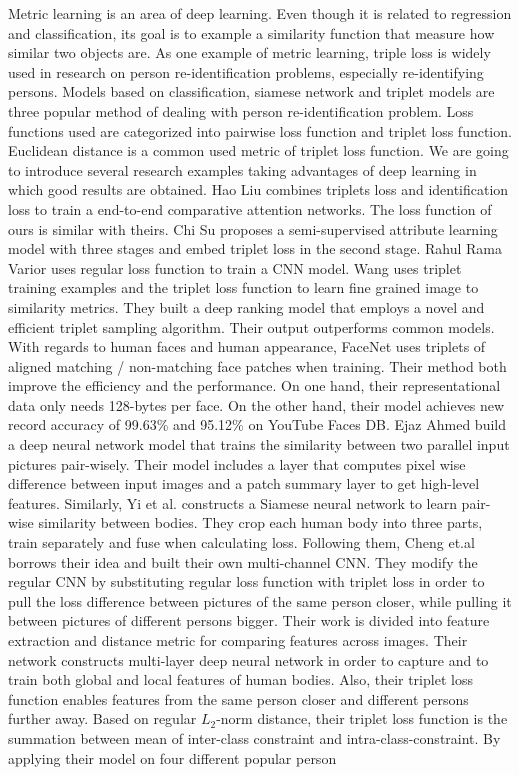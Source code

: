\documentclass[11pt,onecolumn,letterpaper]{article}
\begin{document}
Metric learning is an area of deep learning. Even though it is related to regression and classification, its goal is to example a similarity function that measure how similar two objects are. As one example of metric learning, triple loss is widely used in research on person re-identification problems, especially re-identifying persons. Models based on classification, siamese network and triplet models are three popular method of dealing with person re-identification problem. Loss functions used are categorized into pairwise loss function and triplet loss function. Euclidean distance is a common used metric of triplet loss function. 
\newline
We are going to introduce several research examples taking advantages of deep learning in which good results are obtained. Hao Liu \cite{liu2016end} combines triplets loss and identification loss to train a end-to-end comparative attention networks. The loss function of ours is similar with theirs. Chi Su \cite{su2016deep} proposes a semi-supervised attribute learning model with three stages and embed triplet loss in the second stage. Rahul Rama Varior \cite{varior2016learning} uses regular loss function to train a CNN model. Wang \cite{wang2014learning} uses triplet training examples and the triplet loss function to learn fine grained image to similarity metrics. They built a deep ranking model that employs a novel and efficient triplet sampling algorithm. Their output outperforms common models. With regards to human faces and human appearance, FaceNet \cite{schroff2015facenet} uses triplets of aligned matching / non-matching face patches when training. Their method both improve the efficiency and the performance. On one hand, their representational data only needs 128-bytes per face. On the other hand, their model achieves new record accuracy of 99.63\% and 95.12\% on YouTube Faces DB. Ejaz Ahmed \cite{ahmed2015improved} build a deep neural network model that trains the similarity between two parallel input pictures pair-wisely. Their model includes a layer that computes pixel wise difference between input images and a patch summary layer to get high-level features. Similarly, Yi et al. \cite{yi2014deep} constructs a Siamese neural network to learn pair-wise similarity between bodies. They crop each human body into three parts, train separately and fuse when calculating loss. Following them, Cheng et.al \cite{cheng2016person} borrows their idea and built their own multi-channel CNN. They modify the regular CNN by substituting regular loss function with triplet loss in order to pull the loss difference between pictures of the same person closer, while pulling it between pictures of different persons bigger. Their work is divided into feature extraction and distance metric for comparing features across images. Their network constructs multi-layer deep neural network in order to capture and to train both global and local features of human bodies. Also, their triplet loss function enables features from the same person closer and different persons further away. Based on regular $L_{2}$-norm distance, their triplet loss function is the summation between mean of inter-class constraint and intra-class-constraint. By applying their model on four different popular person 
\end{document}
